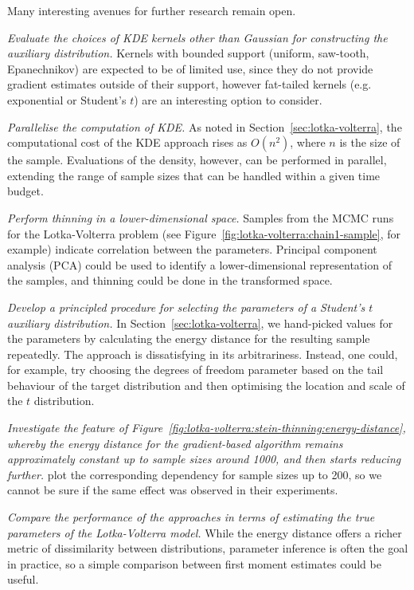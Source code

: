 \documentclass[11pt,a4paper]{report}
\begin{document}
Many interesting avenues for further research remain open.

\textit{Evaluate the choices of KDE kernels other than Gaussian for constructing the auxiliary distribution.} Kernels with bounded support (uniform, saw-tooth, Epanechnikov) are expected to be of limited use, since they do not provide gradient estimates outside of their support, however fat-tailed kernels (e.g. exponential or Student's $t$) are an interesting option to consider.

\textit{Parallelise the computation of KDE.} As noted in Section~\ref{sec:lotka-volterra}, the computational cost of the KDE approach rises as $O(n^2)$, where $n$ is the size of the sample. Evaluations of the density, however, can be performed in parallel, extending the range of sample sizes that can be handled within a given time budget.

\textit{Perform thinning in a lower-dimensional space.} Samples from the MCMC runs for the Lotka-Volterra problem (see Figure~\ref{fig:lotka-volterra:chain1-sample}, for example) indicate correlation between the parameters. Principal component analysis (PCA) could be used to identify a lower-dimensional representation of the samples, and thinning could be done in the transformed space.

\textit{Develop a principled procedure for selecting the parameters of a Student's $t$ auxiliary distribution.} In Section~\ref{sec:lotka-volterra}, we hand-picked values for the parameters by calculating the energy distance for the resulting sample repeatedly. The approach is dissatisfying in its arbitrariness. Instead, one could, for example, try choosing the degrees of freedom parameter based on the tail behaviour of the target distribution and then optimising the location and scale of the $t$ distribution.

\textit{Investigate the feature of Figure~\ref{fig:lotka-volterra:stein-thinning:energy-distance}, whereby the energy distance for the gradient-based algorithm remains approximately constant up to sample sizes around 1000, and then starts reducing further.} \cite{riabizOptimalThinningMCMC2022} plot the corresponding dependency for sample sizes up to 200, so we cannot be sure if the same effect was observed in their experiments.

\textit{Compare the performance of the approaches in terms of estimating the true parameters of the Lotka-Volterra model.} While the energy distance offers a richer metric of dissimilarity between distributions, parameter inference is often the goal in practice, so a simple comparison between first moment estimates could be useful.
\end{document}
